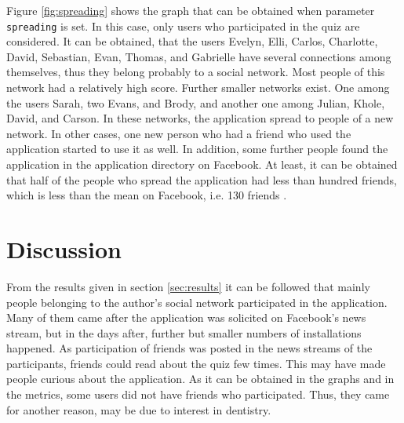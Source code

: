 \documentclass[preprint,12pt]{elsarticle}
\begin{document}
Figure \ref{fig:spreading} shows the graph that can be obtained when
parameter \verb|spreading| is set. In this case, only users who
participated in the quiz are considered. It can be obtained, that the
users Evelyn, Elli, Carlos, Charlotte, David, Sebastian,
Evan, Thomas, and Gabrielle have several connections among themselves,
thus they belong probably to a social network. Most people of this
network had a relatively high score. 
Further smaller networks exist. One among the users Sarah, two Evans,
and Brody, and another one among Julian, Khole, David, and Carson. In
these networks, the application spread to people of a new network. In
other cases, one new person who had a friend who used the application
started to use it as well. In
addition, some further people found the application in the application
directory on Facebook.
At least, it can be obtained that half of the people who spread the application
had less than hundred friends, which is less than the mean on
Facebook, i.e. 130 friends \cite{facebookStats}.










\section{Discussion}
\label{sec:discussion}
From the results given in section \ref{sec:results} it can be followed
that mainly people belonging to the author's social network
participated in the application. Many of them came after the
application was solicited on Facebook's news stream, but in the days
after, further but smaller numbers of installations happened. As participation of friends was posted
in the news streams of the participants, friends could read about the
quiz few times. This may have made people curious about the application.
As it can be obtained in the graphs and in the
metrics, some users did not have friends who participated. Thus, they
came for another reason, may be due to interest in dentistry.
\end{document}

